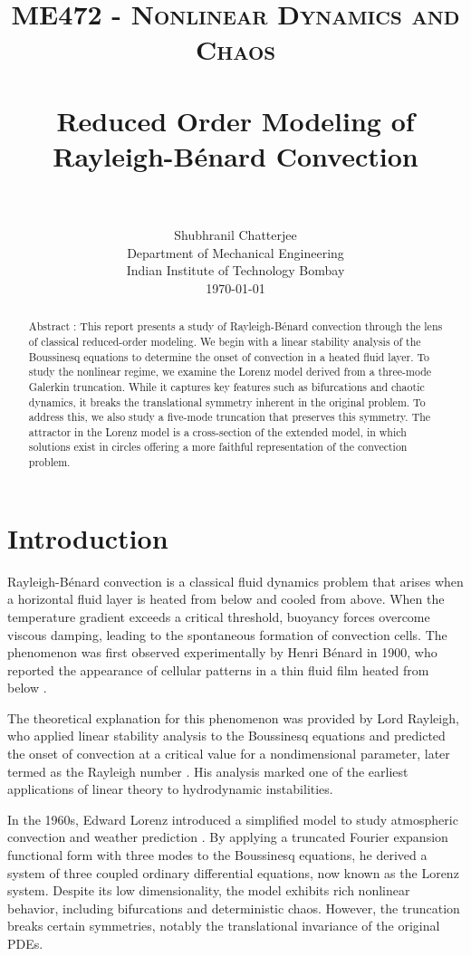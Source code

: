 \documentclass[paper=a4, fontsize=11pt]{scrartcl}
\title{
		\usefont{OT1}{bch}{b}{n}
		\normalfont \normalsize \textsc{ME472 - Nonlinear Dynamics and Chaos} \\ [0.3cm]
		\horrule{0.5pt} \\[0.3cm]
		\huge Reduced Order Modeling of Rayleigh-B\'enard Convection\\
		\horrule{2pt} \\
}
\author{
		\normalfont 								\normalsize
        Shubhranil Chatterjee\\		\normalsize
        Department of Mechanical Engineering\\	\normalsize
        Indian Institute of Technology Bombay\\	[3pt]
        \normalsize \today
}
\date{}
\numberwithin{equation}{section}		%
\numberwithin{figure}{section}			%
\numberwithin{table}{section}				%
\begin{document}
\maketitle
\vspace{-1cm}
\begin{abstract}
	\noindent Abstract : 
	This report presents a study of Rayleigh-Bénard convection through the lens of classical reduced-order modeling. We begin with a linear stability analysis of the Boussinesq equations to determine the onset of convection in a heated fluid layer.
	To study the nonlinear regime, we examine the Lorenz model derived from a three-mode Galerkin truncation. While it captures key features such as bifurcations and chaotic dynamics, it breaks the translational symmetry inherent in the original problem. To address this, we also study a five-mode truncation that preserves this symmetry. The attractor in the Lorenz model is a cross-section of the extended model, in which solutions exist in circles offering a more faithful representation of the convection problem.
\end{abstract}

\section{Introduction}

Rayleigh-Bénard convection is a classical fluid dynamics problem that arises when a horizontal fluid layer is heated from below and cooled from above. When the temperature gradient exceeds a critical threshold, buoyancy forces overcome viscous damping, leading to the spontaneous formation of convection cells. The phenomenon was first observed experimentally by Henri Bénard in 1900, who reported the appearance of cellular patterns in a thin fluid film heated from below \cite{benard1900}.

The theoretical explanation for this phenomenon was provided by Lord Rayleigh, who applied linear stability analysis to the Boussinesq equations and predicted the onset of convection at a critical value for a nondimensional parameter, later termed as the Rayleigh number \cite{rayleigh1916}. His analysis marked one of the earliest applications of linear theory to hydrodynamic instabilities.

In the 1960s, Edward Lorenz introduced a simplified model to study atmospheric convection and weather prediction \cite{lorenz1963}. By applying a truncated Fourier expansion functional form with three modes to the Boussinesq equations, he derived a system of three coupled ordinary differential equations, now known as the Lorenz system. Despite its low dimensionality, the model exhibits rich nonlinear behavior, including bifurcations and deterministic chaos. However, the truncation breaks certain symmetries, notably the translational invariance of the original PDEs.
\end{document}
